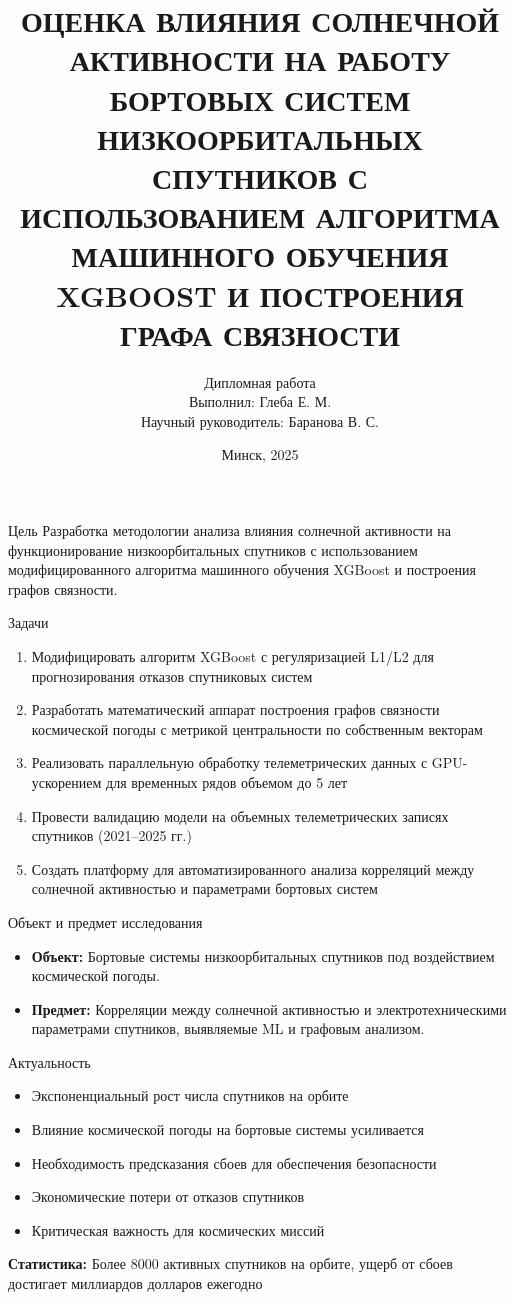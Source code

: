 \documentclass[aspectratio=43]{beamer}
\title[Оценка влияния солнечной активности]{ОЦЕНКА ВЛИЯНИЯ СОЛНЕЧНОЙ АКТИВНОСТИ НА РАБОТУ БОРТОВЫХ СИСТЕМ НИЗКООРБИТАЛЬНЫХ СПУТНИКОВ С ИСПОЛЬЗОВАНИЕМ АЛГОРИТМА МАШИННОГО ОБУЧЕНИЯ XGBOOST И ПОСТРОЕНИЯ ГРАФА СВЯЗНОСТИ}
\author{
    Дипломная работа\\
    Выполнил: Глеба Е. М.\\
    Научный руководитель: Баранова В. С.
}
\institute{Белорусский государственный университет
Факультет радиофизики и компьютерных технологий
Кафедра физики и аэрокосмических технологий
}
\date{Минск, 2025}
\begin{document}
\begin{frame}[plain]
  \titlepage
\end{frame}

\begin{frame}{Цель}
  Разработка методологии анализа влияния солнечной активности на функционирование низкоорбитальных спутников с использованием модифицированного алгоритма машинного обучения XGBoost и построения графов связности.
\end{frame}

\begin{frame}{Задачи}
  \begin{enumerate}
    \item Модифицировать алгоритм XGBoost с регуляризацией L1/L2 для прогнозирования отказов спутниковых систем
    \item Разработать математический аппарат построения графов связности космической погоды с метрикой центральности по собственным векторам
    \item Реализовать параллельную обработку телеметрических данных с GPU-ускорением для временных рядов объемом до 5 лет
    \item Провести валидацию модели на объемных телеметрических записях спутников (2021--2025 гг.)
    \item Создать платформу для автоматизированного анализа корреляций между солнечной активностью и параметрами бортовых систем
  \end{enumerate}
\end{frame}

\begin{frame}{Объект и предмет исследования}
  \begin{itemize}
    \item \textbf{Объект:} Бортовые системы низкоорбитальных спутников под воздействием космической погоды.
    \item \textbf{Предмет:} Корреляции между солнечной активностью и электротехническими параметрами спутников, выявляемые ML и графовым анализом.
  \end{itemize}
\end{frame}

\begin{frame}{Актуальность}
  \begin{itemize}
    \item Экспоненциальный рост числа спутников на орбите
    \item Влияние космической погоды на бортовые системы усиливается
    \item Необходимость предсказания сбоев для обеспечения безопасности
    \item Экономические потери от отказов спутников
    \item Критическая важность для космических миссий
  \end{itemize}
  \vspace{1em}
  \textbf{Статистика:} Более 8000 активных спутников на орбите, ущерб от сбоев достигает миллиардов долларов ежегодно
\end{frame}
\end{document}
